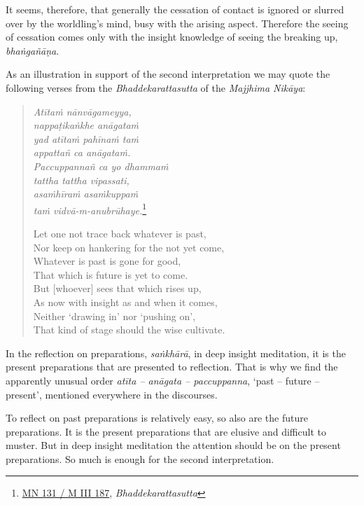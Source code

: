 It seems, therefore, that generally the cessation of contact is ignored or slurred over by the worldling's mind, busy with the arising aspect. Therefore the seeing of cessation comes only with the insight knowledge of seeing the breaking up, \emph{bhaṅgañāṇa}.

As an illustration in support of the second interpretation we may quote the following verses from the \emph{Bhaddekarattasutta} of the \emph{Majjhima Nikāya}:

\begin{quote}
\emph{Atītaṁ nānvāgameyya,}\\
\emph{nappaṭikaṅkhe anāgataṁ}\\
\emph{yad atītaṁ pahīnaṁ taṁ}\\
\emph{appattañ ca anāgataṁ.}\\
\emph{Paccuppannañ ca yo dhammaṁ}\\
\emph{tattha tattha vipassati,}\\
\emph{asaṁhīraṁ asaṁkuppaṁ}\\
\emph{taṁ vidvā-m-anubrūhaye.}\footnote{\href{https://suttacentral.net/mn131/pli/ms}{MN 131 / M III 187}, \emph{Bhaddekarattasutta}}

Let one not trace back whatever is past,\\
Nor keep on hankering for the not yet come,\\
Whatever is past is gone for good,\\
That which is future is yet to come.\\
But {[}whoever{]} sees that which rises up,\\
As now with insight as and when it comes,\\
Neither `drawing in' nor `pushing on',\\
That kind of stage should the wise cultivate.
\end{quote}

In the reflection on preparations, \emph{saṅkhārā}, in deep insight meditation, it is the present preparations that are presented to reflection. That is why we find the apparently unusual order \emph{atīta -- anāgata -- paccuppanna}, `past -- future -- present', mentioned everywhere in the discourses.

To reflect on past preparations is relatively easy, so also are the future preparations. It is the present preparations that are elusive and difficult to muster. But in deep insight meditation the attention should be on the present preparations. So much is enough for the second interpretation.

